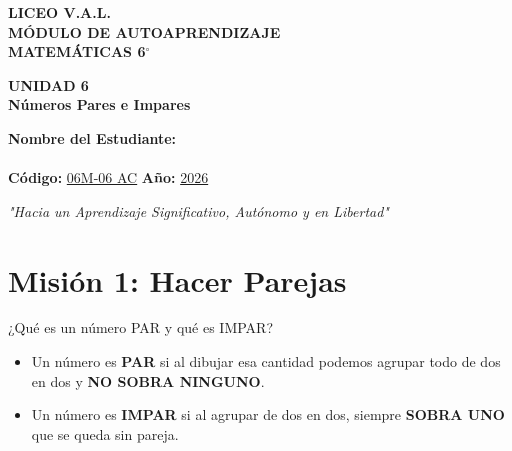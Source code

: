 \documentclass[12pt, letterpaper]{article}
\begin{document}
	
	\begin{center}
		{\Huge \textbf{LICEO V.A.L.}}\\[0.5cm]
		{\LARGE \textbf{MÓDULO DE AUTOAPRENDIZAJE}}\\[0.5cm]
		{\Large \textbf{MATEMÁTICAS 6$^\circ$}}\\[0.5cm]
		
		\begin{tcolorbox}[colback=valblue!10, colframe=valblue, arc=3mm, boxrule=1.5pt]
			\centering \Huge \textbf{UNIDAD 6}\\[0.2cm]
			\Large \textbf{Números Pares e Impares}
		\end{tcolorbox}
		
		\vspace{0.6cm}
		\begin{tcolorbox}[colback=white, colframe=valblue, width=12cm, arc=3mm, boxrule=1.5pt]
			\centering
			\vspace{0.3cm}
			\textbf{Nombre del Estudiante:}\\[0.3cm]
			\underline{\hspace{9cm}}\\[0.5cm]
			\textbf{Código:} \underline{06M-06 AC} \hspace{1cm} \textbf{Año:} \underline{2026}
			\vspace{0.3cm}
		\end{tcolorbox}
		
		\vspace{0.8cm}
		\textit{"Hacia un Aprendizaje Significativo, Autónomo y en Libertad"}
		
	\end{center}
	
	
	\section*{Misión 1: Hacer Parejas}
	
	\begin{concepto}{¿Qué es un número PAR y qué es IMPAR?}
		\begin{itemize}
			\item Un número es \textbf{PAR} si al dibujar esa cantidad podemos agrupar todo de dos en dos y \textbf{NO SOBRA NINGUNO}.
			\item Un número es \textbf{IMPAR} si al agrupar de dos en dos, siempre \textbf{SOBRA UNO} que se queda sin pareja.
		\end{itemize}
	\end{concepto}
	
\end{document}
